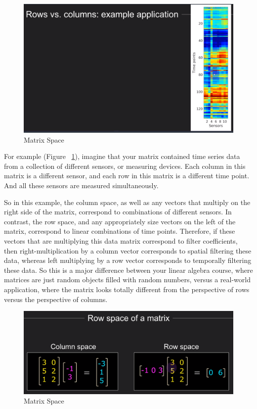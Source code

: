\documentclass[fleqn,10pt]{olplainarticle}
\theoremstyle{definition}
\theoremstyle{remark}
\begin{document}
\begin{figure}[ht]
	\centering
	\includegraphics[width=0.5\linewidth]{images/matrix-space-15.png}
	\caption{Matrix Space}
	\label{fig:matrix_space_15}
\end{figure}

For example (Figure ~\ref{fig:matrix_space_15}), imagine that your matrix contained time series data from a collection of different sensors, or measuring devices. Each column in this matrix is a different sensor, and each row in this matrix is a different time point. And all these sensors are measured simultaneously. 

So in this example, the column space, as well as any vectors that multiply on the right side of the matrix, correspond to combinations of different sensors. In contrast, the row space, and any appropriately size vectors on the left of the matrix, correspond to linear combinations of time points. Therefore, if these vectors that are multiplying this data matrix correspond to filter coefficients, then right-multiplication by a column vector corresponds to spatial filtering these data, whereas left multiplying by a row vector corresponds to temporally filtering these data. So this is a major difference between your linear algebra course, where matrices are just random objects filled with random numbers, versus a real-world application, where the matrix looks totally different from the perspective of rows versus the perspective of columns.

\begin{figure}[ht]
	\centering
	\includegraphics[width=0.9\linewidth]{images/matrix-space-16.png}
	\caption{Matrix Space}
	\label{fig:matrix_space_16}
\end{figure}
\end{document}
